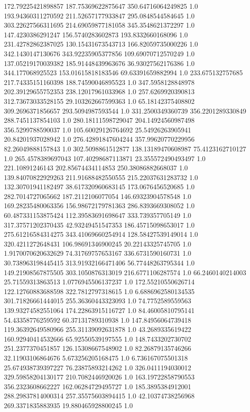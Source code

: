 172.79225421898857	187.75369622875647	350.64716064249825	1.0
193.94360311270592	211.52657177933847	295.0848544584645	1.0
303.22627566311695	214.69059877181058	345.3548621372297	1.0
147.4230386291247	156.5740283602873	193.8332660168096	1.0
231.42782862387025	130.15431673543713	166.82059735000226	1.0
342.1430147130676	343.92235905377856	109.69070712570249	1.0
137.05219170039382	185.91448439963676	36.93027562176386	1.0
344.177068925523	153.01615818183546	69.63391659882994	1.0
233.675132757685	217.74335151160398	188.74590046895523	1.0
347.5958128848978	202.39129655752353	238.12017961033968	1.0
257.6269920390813	312.73673033528155	29.103262667599363	1.0
65.18142375408802	309.2696371856657	293.5094987593544	1.0
331.2500349360739	356.2201289330849	288.7451137854103	1.0
280.18111598729047	204.14924560987498	356.5299788590037	1.0
105.60029126764692	25.54926263905941	20.84201937028942	1.0
276.42891847604244	357.99620770229956	82.26049888157843	1.0
302.5098861512877	138.13189470608987	75.4123162710127	1.0
265.4578389697043	107.40298687113871	23.355572490493497	1.0
221.10891246143	202.85674434114853	250.38086882668037	1.0
139.84070822929263	211.91688482550555	215.22037631283732	1.0
132.30701941182497	38.617320960683145	173.0676456520685	1.0
282.7014727065662	187.2112106077054	146.69323904578548	1.0
169.28235480063356	156.98672179781363	286.8393669308052	1.0
60.487331153875424	112.39583691698647	333.739357705149	1.0
317.37571202370435	42.93249451547353	186.45715098653017	1.0
275.61216584314275	343.41069660254914	128.58427539149014	1.0
320.4211272648431	106.98691346900245	20.22143325745705	1.0
1.9170070620632629	74.31769757653167	336.6731590160731	1.0
30.738963198445415	313.91932166471406	56.77448263795344	1.0
149.21908567875505	303.1050876313019	216.6771106287574	1.0
66.2460140214003	25.71559313863513	1.0776945506137237	1.0
172.55210550626714	122.12760883688598	322.7812797318615	1.0
6.6886962580134535	301.71826661444015	255.36360443323093	1.0
74.7752589559563	139.93274582551064	174.22863915116727	1.0
84.46005810795141	54.43358776259592	60.37131789310938	1.0
147.84956064739418	119.36392649580966	255.31139092631878	1.0
43.2689335619422	160.92940414532666	65.92550539197555	1.0
148.7433202730702	251.2377370451857	126.15308667548902	1.0
82.26879135746266	32.11903106864676	5.673256205168475	1.0
6.736167075501318	25.674938739397227	76.23875893214262	1.0
326.0411194030012	329.59858204130177	210.7082446920026	1.0
163.19722858790553	356.2323608662227	162.06284729495727	1.0
185.3895384912001	288.29837814000314	257.35575603894415	1.0
42.10374738256968	269.3371835883935	19.880465928800245	1.0
